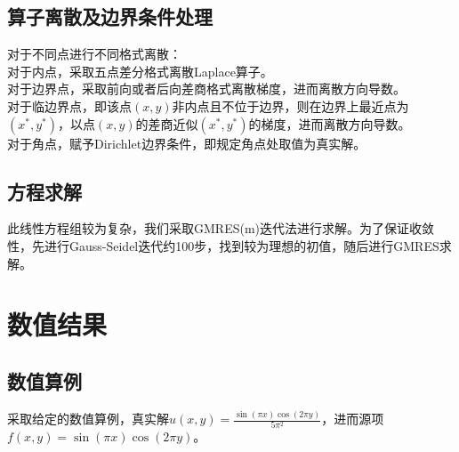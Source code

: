 \documentclass[11pt,a4 paper,one side]{article}
\begin{document}
\subsection{算子离散及边界条件处理}
对于不同点进行不同格式离散：
\\ 对于内点，采取五点差分格式离散Laplace算子。
\\ 对于边界点，采取前向或者后向差商格式离散梯度，进而离散方向导数。
\\ 对于临边界点，即该点$(x,y)$非内点且不位于边界，则在边界上最近点为$(x^*,y^*)$，以点$(x,y)$的差商近似$(x^*,y^*)$的梯度，进而离散方向导数。
\\ 对于角点，赋予Dirichlet边界条件，即规定角点处取值为真实解。
\subsection{方程求解}
此线性方程组较为复杂，我们采取GMRES(m)迭代法进行求解。为了保证收敛性，先进行Gauss-Seidel迭代约100步，找到较为理想的初值，随后进行GMRES求解。
\section{数值结果}
\subsection{数值算例}
采取给定的数值算例，真实解$u(x,y)=\frac{\sin(\pi x)\cos(2\pi y)}{5\pi^2}$，进而源项$f(x,y)=\sin(\pi x)\cos(2\pi y)$。
\end{document}
